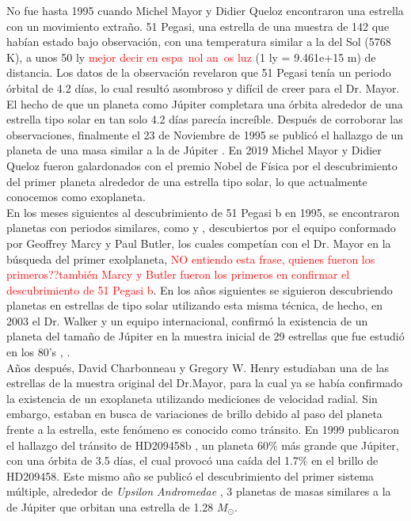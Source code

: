 No fue hasta 1995 cuando Michel Mayor y Didier Queloz encontraron una estrella con un movimiento extraño. 51 Pegasi, una estrella de una muestra de 142 que habían estado bajo observación, con una temperatura similar a la del Sol (5768 K), a unos 50 ly \textcolor{red}{mejor decir en espa~nol an~os luz} (1 ly = 9.461e+15 m) de distancia. Los datos de la observación revelaron que 51 Pegasi tenía un periodo órbital de 4.2 días, lo cual resultó asombroso y difícil de creer para el Dr. Mayor. El hecho de que un planeta como Júpiter completara una órbita alrededor de una estrella tipo solar en tan solo 4.2 días parecía increíble. Después de corroborar las observaciones, finalmente el 23 de Noviembre de 1995 se publicó el hallazgo de un planeta de una masa similar a la de Júpiter \cite{mayor1995jupiter}. En 2019 Michel Mayor y Didier Queloz fueron galardonados con el premio Nobel de Física por el descubrimiento del primer planeta alrededor de una estrella tipo solar, lo que actualmente conocemos como exoplaneta.\\

En los meses siguientes al descubrimiento de 51 Pegasi b en 1995, se encontraron planetas con periodos similares, como \cite{Marcy_1996} y \cite{butler1996planet}, descubiertos por el equipo conformado por Geoffrey Marcy y Paul Butler, los cuales competían con el Dr. Mayor en la búsqueda del primer exolplaneta, \textcolor{red}{NO entiendo esta frase, quienes fueron los primeros??también Marcy y Butler fueron los primeros en confirmar el descubrimiento de 51 Pegasi b}. En los años siguientes se siguieron descubriendo planetas en estrellas de tipo solar utilizando esta misma técnica, de hecho, en 2003 el Dr. Walker y un equipo internacional, confirmó la existencia de un planeta del tamaño de Júpiter en la muestra inicial de 29 estrellas que fue estudió en los 80's \cite{hatzes2003planetary}, \cite{walker2012first}.\\

Años después, David Charbonneau y Gregory W. Henry estudiaban una de las estrellas de la muestra original del Dr.Mayor, para la cual ya se había confirmado la existencia de un exoplaneta utilizando mediciones de velocidad radial. Sin embargo, estaban en busca de variaciones de brillo debido al paso del planeta frente a la estrella, este fenómeno es conocido como tránsito. En 1999 publicaron el hallazgo del tránsito de HD209458b \cite{charbonneau1999detection}, un planeta 60\% más grande que Júpiter, con una órbita de 3.5 días, el cual provocó una caída del 1.7\% en el brillo de HD209458. Este mismo año se publicó el descubrimiento del primer sistema múltiple, alrededor de \textit{Upsilon Andromedae} \cite{marcy1999three}, 3 planetas de masas similares a la de Júpiter que orbitan una estrella de 1.28 $M_{\odot}$.\\

